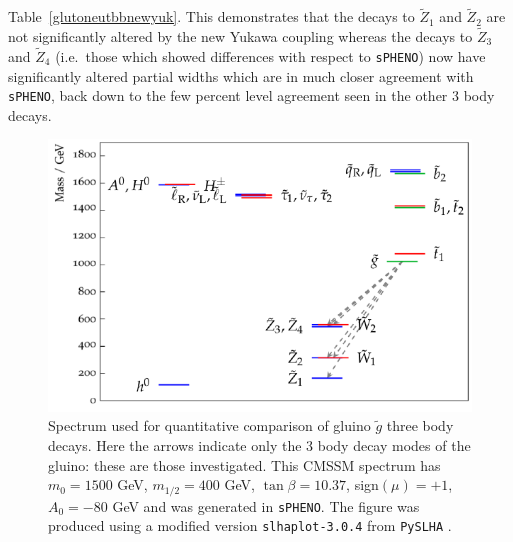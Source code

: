 \documentclass[final,3p,times]{elsarticle}
\begin{document}
Table~\ref{glutoneutbbnewyuk}. This demonstrates that the decays to
$\tilde{Z}_1$ and $\tilde{Z}_2$ are not significantly altered by the new
Yukawa coupling whereas the decays to $\tilde{Z}_3$ and $\tilde{Z}_4$
(i.e.\ those which showed differences with respect to {\tt sPHENO}) now have
significantly altered partial widths which are in much closer agreement with
{\tt sPHENO}, back down to the few percent level agreement seen in the other
3 body decays. 
\begin{figure}
\centerline{\includegraphics[scale=1.2]{figure3.pdf}} 
\caption{Spectrum used for quantitative comparison of gluino $\tilde{g}$ three
  body decays. Here the arrows indicate only the 3 body decay modes of the
  gluino: these are those investigated. This CMSSM spectrum has $m_0 = 1500$
  GeV, $m_{1/2} 
  = 400$ GeV, $\tan\beta = 10.37$, sign$(\mu) = +1$, $A_0 = -80$ GeV and was
  generated 
  in {\tt sPHENO}. 
The figure was produced using a modified version {\tt slhaplot-3.0.4} from
  {\tt PySLHA} \cite{Buckley:2013}.} \label{gluino3bodyspc} 
\end{figure}
\end{document}
